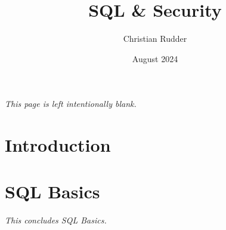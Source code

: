 \documentclass{article}
\title{SQL \& Security}
\author{Christian Rudder}
\date{August 2024}
\begin{document}
\maketitle

\tableofcontents

\newpage
\thispagestyle{empty}
\mbox{}
\vfill
\begin{center}
    \textit{This page is left intentionally blank.}
\end{center}
\vfill
\newpage

\section{Introduction}

\newpage

\section{SQL Basics}




\newpage

\newpage


\vspace{2em}
\begin{center}
    \textit{This concludes SQL Basics.}
\end{center}
\end{document}
